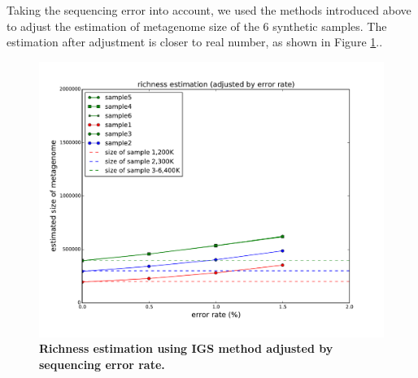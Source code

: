 \documentclass{article}
\begin{document}
Taking the sequencing error into account, we used the methods introduced above
to adjust the estimation of metagenome size of the 6 synthetic samples. The
estimation after adjustment is closer to real number, as shown in Figure
\ref{fig:IGS_richness_error_adjustment}..


\begin{figure}[!ht]
 \centerline{\includegraphics[width=6in]{./figures/alpha_by_error_erroronly_adjust.pdf}}
\caption{\bf Richness estimation using IGS method adjusted by sequencing error
rate.}
\label{fig:IGS_richness_error_adjustment}
\end{figure}
\end{document}
